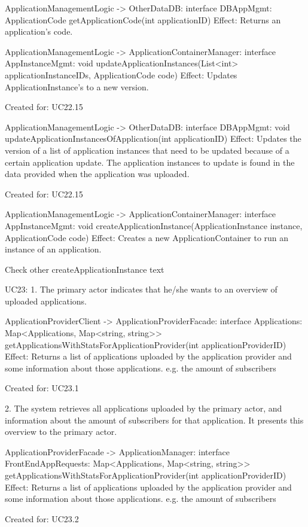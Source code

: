             ApplicationManagementLogic -> OtherDataDB: interface DBAppMgmt: ApplicationCode getApplicationCode(int applicationID)
                Effect: Returns an application's code.

            ApplicationManagementLogic -> ApplicationContainerManager: interface AppInstanceMgmt: void updateApplicationInstances(List<int> applicationInstanceIDs, ApplicationCode code)
                Effect: Updates ApplicationInstance's to a new version.
                \item Created for: UC22.15

            ApplicationManagementLogic -> OtherDataDB: interface DBAppMgmt: void updateApplicationInstancesOfApplication(int applicationID)
                Effect: Updates the version of a list of application instances that need to be updated because of a certain application update. The application instances to update is found in the data provided when the application was uploaded.
                \item Created for: UC22.15

        ApplicationManagementLogic -> ApplicationContainerManager: interface AppInstanceMgmt: void createApplicationInstance(ApplicationInstance instance, ApplicationCode code)
            Effect: Creates a new ApplicationContainer to run an instance of an application.

        Check other createApplicationInstance text


    UC23:
        1. The primary actor indicates that he/she wants to an overview of uploaded applications.

            ApplicationProviderClient -> ApplicationProviderFacade: interface Applications: Map<Applications, Map<string, string>> getApplicationsWithStatsForApplicationProvider(int applicationProviderID)
                Effect: Returns a list of applications uploaded by the application provider and some information about those applications. e.g. the amount of subscribers
                \item Created for: UC23.1

        2. The system retrieves all applications uploaded by the primary actor, and information about the amount of subscribers for that application. It presents this overview to the primary actor.

            ApplicationProviderFacade -> ApplicationManager: interface FrontEndAppRequests: Map<Applications, Map<string, string>> getApplicationsWithStatsForApplicationProvider(int applicationProviderID)
                Effect: Returns a list of applications uploaded by the application provider and some information about those applications. e.g. the amount of subscribers
                \item Created for: UC23.2

